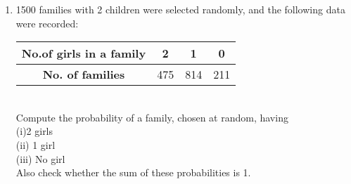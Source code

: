 \renewcommand{\theequation}{\theenumi}
\begin{enumerate}[label=\arabic*.,ref=\thesubsection.\theenumi]
	\item 1500 families with 2 children were selected randomly, and the following data were recorded:\\
	
	\begin{tabular}{ |c|c|c|c| } 
		\hline
		\textbf{No.of girls in a family} &2 &1 &0\\ 
		\hline
		\textbf{No. of families}  &475 &814 &211\\ 
		\hline
	\end{tabular}\\
	
	Compute the probability of a family, chosen at random, having\\
	(i)2 girls\\
	(ii) 1 girl\\
	(iii) No girl\\
	Also check whether the sum of these probabilities is 1.
\end{enumerate}
